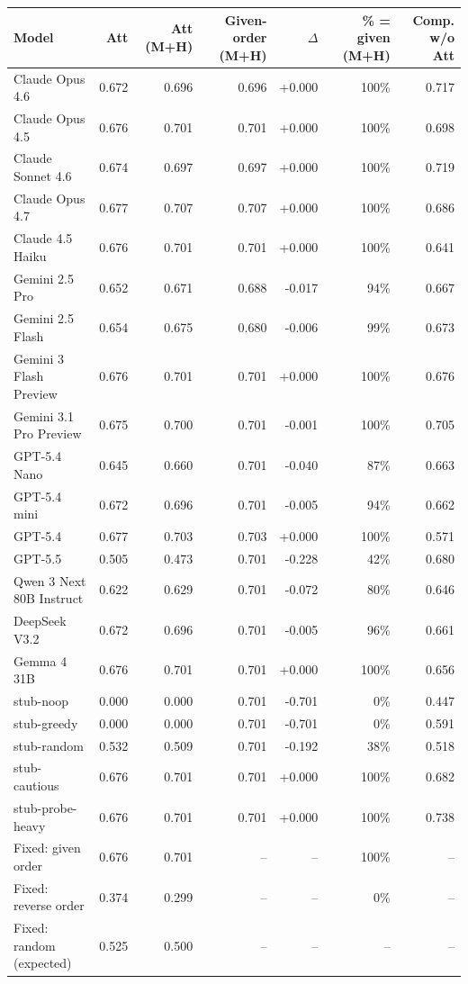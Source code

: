 \begin{tabular}{lrrrrrr}
\toprule
Model & Att & Att (M+H) & Given-order (M+H) & $\Delta$ & \% = given (M+H) & Comp. w/o Att \\
\midrule
Claude Opus 4.6 & 0.672 & 0.696 & 0.696 & +0.000 & 100\% & 0.717 \\
Claude Opus 4.5 & 0.676 & 0.701 & 0.701 & +0.000 & 100\% & 0.698 \\
Claude Sonnet 4.6 & 0.674 & 0.697 & 0.697 & +0.000 & 100\% & 0.719 \\
Claude Opus 4.7 & 0.677 & 0.707 & 0.707 & +0.000 & 100\% & 0.686 \\
Claude 4.5 Haiku & 0.676 & 0.701 & 0.701 & +0.000 & 100\% & 0.641 \\
Gemini 2.5 Pro & 0.652 & 0.671 & 0.688 & -0.017 & 94\% & 0.667 \\
Gemini 2.5 Flash & 0.654 & 0.675 & 0.680 & -0.006 & 99\% & 0.673 \\
Gemini 3 Flash Preview & 0.676 & 0.701 & 0.701 & +0.000 & 100\% & 0.676 \\
Gemini 3.1 Pro Preview & 0.675 & 0.700 & 0.701 & -0.001 & 100\% & 0.705 \\
GPT-5.4 Nano & 0.645 & 0.660 & 0.701 & -0.040 & 87\% & 0.663 \\
GPT-5.4 mini & 0.672 & 0.696 & 0.701 & -0.005 & 94\% & 0.662 \\
GPT-5.4 & 0.677 & 0.703 & 0.703 & +0.000 & 100\% & 0.571 \\
GPT-5.5 & 0.505 & 0.473 & 0.701 & -0.228 & 42\% & 0.680 \\
Qwen 3 Next 80B Instruct & 0.622 & 0.629 & 0.701 & -0.072 & 80\% & 0.646 \\
DeepSeek V3.2 & 0.672 & 0.696 & 0.701 & -0.005 & 96\% & 0.661 \\
Gemma 4 31B & 0.676 & 0.701 & 0.701 & +0.000 & 100\% & 0.656 \\
stub-noop & 0.000 & 0.000 & 0.701 & -0.701 & 0\% & 0.447 \\
stub-greedy & 0.000 & 0.000 & 0.701 & -0.701 & 0\% & 0.591 \\
stub-random & 0.532 & 0.509 & 0.701 & -0.192 & 38\% & 0.518 \\
stub-cautious & 0.676 & 0.701 & 0.701 & +0.000 & 100\% & 0.682 \\
stub-probe-heavy & 0.676 & 0.701 & 0.701 & +0.000 & 100\% & 0.738 \\
\midrule
Fixed: given order & 0.676 & 0.701 & -- & -- & 100\% & -- \\
Fixed: reverse order & 0.374 & 0.299 & -- & -- & 0\% & -- \\
Fixed: random (expected) & 0.525 & 0.500 & -- & -- & -- & -- \\
\bottomrule
\end{tabular}
